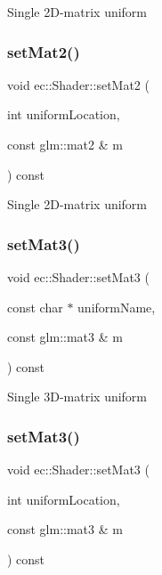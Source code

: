 Single 2\+D-\/matrix uniform \mbox{\label{classec_1_1_shader_a6b2ee27e91d3f4f9465008df1aad4366}} 
\subsubsection{\texorpdfstring{set\+Mat2()}{setMat2()}\hspace{0.1cm}{\footnotesize\ttfamily [2/2]}}
{\footnotesize\ttfamily void ec\+::\+Shader\+::set\+Mat2 (\begin{DoxyParamCaption}\item[{int}]{uniform\+Location,  }\item[{const glm\+::mat2 \&}]{m }\end{DoxyParamCaption}) const}

Single 2\+D-\/matrix uniform \mbox{\label{classec_1_1_shader_abb9b4a0e149edcba5ad255f2393b52bf}} 
\subsubsection{\texorpdfstring{set\+Mat3()}{setMat3()}\hspace{0.1cm}{\footnotesize\ttfamily [1/2]}}
{\footnotesize\ttfamily void ec\+::\+Shader\+::set\+Mat3 (\begin{DoxyParamCaption}\item[{const char $\ast$}]{uniform\+Name,  }\item[{const glm\+::mat3 \&}]{m }\end{DoxyParamCaption}) const}

Single 3\+D-\/matrix uniform \mbox{\label{classec_1_1_shader_a134b5b5da07fba23324b1035d3b246cb}} 
\subsubsection{\texorpdfstring{set\+Mat3()}{setMat3()}\hspace{0.1cm}{\footnotesize\ttfamily [2/2]}}
{\footnotesize\ttfamily void ec\+::\+Shader\+::set\+Mat3 (\begin{DoxyParamCaption}\item[{int}]{uniform\+Location,  }\item[{const glm\+::mat3 \&}]{m }\end{DoxyParamCaption}) const}

